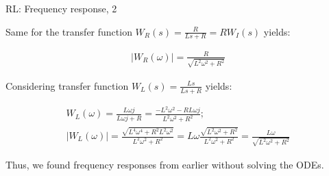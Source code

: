 \documentclass{beamer}
\begin{document}
\begin{frame}{RL: Frequency response, 2}
	\begin{flushleft}
		
		Same for the transfer function $W_R(s) = \frac{R}{Ls + R} = R W_I(s) $ yields:
		
		\begin{align}
			|W_R(\omega)| = 
			\frac{R}{\sqrt{L^2\omega^2 + R^2}}
		\end{align}
	
		Considering transfer function $W_L(s) = \frac{Ls}{Ls + R}$ yields:
		
		\begin{align*}
			W_L(\omega) = \frac{L\omega j}{L\omega j + R} =
			\frac{-L^2\omega^2 - RL\omega j}{L^2\omega^2 + R^2}; \\
			|W_L(\omega)| = \frac{\sqrt{L^4\omega^4 + R^2L^2\omega^2}}{L^2\omega^2 + R^2} =
			L\omega\frac{\sqrt{L^2\omega^2 + R^2}}{L^2\omega^2 + R^2} =
			\frac{L\omega}{\sqrt{L^2\omega^2 + R^2}}
		\end{align*}
	
		Thus, we found frequency responses from earlier without solving the ODEs.
		
	\end{flushleft}
\end{frame}
\end{document}
